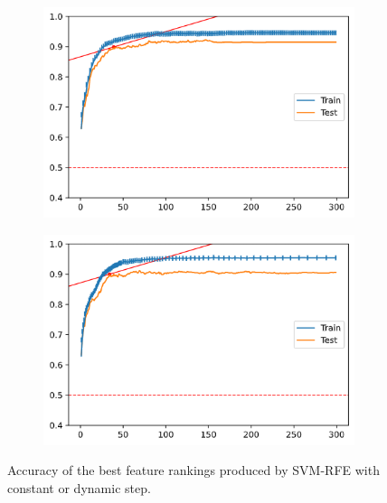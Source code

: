\begin{figure}[H]
    \centering
    \begin{subfigure}[b]{0.4\linewidth}
        \includegraphics[width=\linewidth]{img/ch5/dstep/vanilla1.png}
    \end{subfigure}
    \begin{subfigure}[b]{0.4\linewidth}
        \includegraphics[width=\linewidth]{img/ch5/dstep/vanilla2.png}
    \end{subfigure}
    \caption[Dynamic step: Constant vs Dynamic]{Accuracy of the best feature rankings produced by SVM-RFE with constant or dynamic step.}
    \label{fig:ch5.dstep.vanillabest}
\end{figure}

